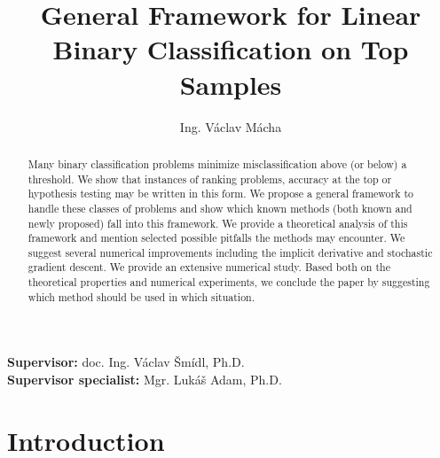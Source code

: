 \documentclass[11pt,a4paper]{article}
\theoremstyle{definition}
\begin{document}
\begin{titlepage}
  \title{General Framework for Linear Binary Classification on Top Samples}
  \author{Ing. V\'aclav M\'acha}
  \maketitle

  \noindent \textbf{Supervisor:} doc. Ing. V\'aclav \v{S}m\'idl, Ph.D. \\
  \noindent \textbf{Supervisor specialist:} Mgr. Luk\'a\v{s} Adam, Ph.D. \\

  \begin{abstract}
    Many binary classification problems minimize misclassification above (or below) a threshold. We show that instances of ranking problems, accuracy at the top or hypothesis testing may be written in this form. We propose a general framework to handle these classes of problems and show which known methods (both known and newly proposed) fall into this framework. We provide a theoretical analysis of this framework and mention selected possible pitfalls the methods may encounter. We suggest several numerical improvements including the implicit derivative and stochastic gradient descent. We provide an extensive numerical study. Based both on the theoretical properties and numerical experiments, we conclude the paper by suggesting which method should be used in which situation.
  \end{abstract}

  \thispagestyle{empty}
\end{titlepage}

\tableofcontents
\thispagestyle{empty}

\clearpage
\section{Introduction}
\end{document}

